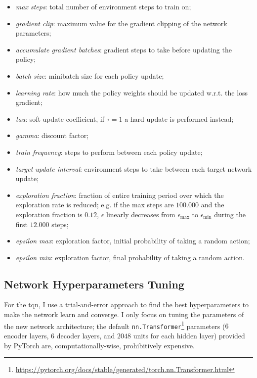 \begin{itemize}
    \item \textit{max steps}: total number of environment steps to train on;
    \item \textit{gradient clip}: maximum value for the gradient clipping of the network parameters;
    \item \textit{accumulate gradient batches}: gradient steps to take before updating the policy; 
    \item \textit{batch size}: minibatch size for each policy update;
    \item \textit{learning rate}: how much the policy weights should be updated w.r.t. the loss gradient;
    \item \textit{tau}: soft update coefficient, if $\tau = 1$ a hard update is performed instead;
    \item \textit{gamma}: discount factor;
    \item \textit{train frequency}: steps to perform between each policy update;
    \item \textit{target update interval}: environment steps to take between each target network update;
    \item \textit{exploration fraction}: fraction of entire training period over which the exploration rate is reduced; e.g. if the max steps are $100.000$ and the exploration fraction is $0.12$, $\epsilon$ linearly decreases from $\epsilon_{\max}$ to $\epsilon_{\min}$ during the first $12.000$ steps; 
    \item \textit{epsilon max}: exploration factor, initial probability of taking a random action;
    \item \textit{epsilon min}: exploration factor, final probability of taking a random action.
\end{itemize}

\subsection{Network Hyperparameters Tuning}
For the \acrshort{tqn}, I use a trial-and-error approach to find the best hyperparameters to make the network learn and converge. I only focus on tuning the parameters of the new network architecture; the default \texttt{nn.Transformer}\footnote{\url{https://pytorch.org/docs/stable/generated/torch.nn.Transformer.html}} parameters ($6$ encoder layers, $6$ decoder layers, and $2048$ units for each hidden layer) provided by PyTorch are, computationally-wise, prohibitively expensive.

